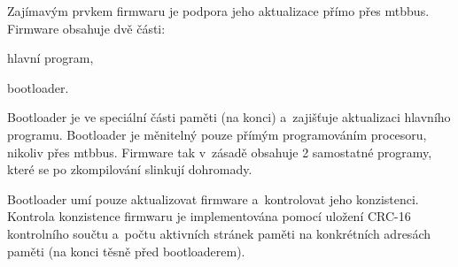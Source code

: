 Zajímavým prvkem firmwaru je podpora jeho aktualizace přímo přes \gls{mtbbus}.
Firmware obsahuje dvě části:

\begin{compactenum}
\item hlavní program,
\item bootloader.
\end{compactenum}

Bootloader je ve speciální části paměti (na konci) a~zajišťuje
aktualizaci hlavního programu. Bootloader je měnitelný pouze přímým
programováním procesoru, nikoliv přes \gls{mtbbus}. Firmware tak v~zásadě
obsahuje 2 samostatné programy, které se po zkompilování slinkují dohromady.

Bootloader umí pouze aktualizovat firmware a~kontrolovat jeho konzistenci.
Kontrola konzistence firmwaru je implementována pomocí uložení CRC-16
kontrolního součtu a~počtu aktivních stránek paměti na konkrétních adresách
paměti (na konci těsně před bootloaderem).
